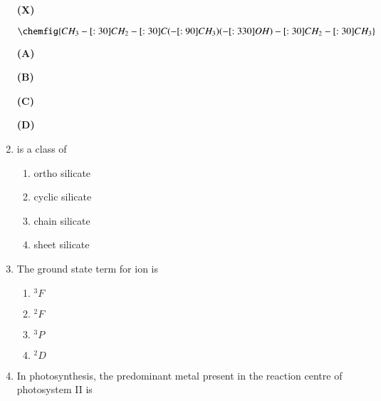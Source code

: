 \documentclass[journal,12pt,onecolumn]{IEEEtran}
\theoremstyle{remark}
\begin{document}
\begin{enumerate}
 

\textbf{(X)}

\[
\chemfig{CH_3-[:30]CH_2-[:30]C(-[:90]CH_3)(-[:330]OH)-[:30]CH_2-[:30]CH_3}
\]

 

\begin{multicols}{2}
\noindent
\textbf{(A)} \\

 

\noindent
\textbf{(B)} \\

 

\noindent
\textbf{(C)} \\

 

\noindent
\textbf{(D)} \\

\end{multicols}

\item {} is a class of \hfill{}
\begin{multicols}{4}
   

\begin{enumerate}
     \item   ortho silicate
     \item   cyclic silicate
     \item   chain silicate
     \item   sheet silicate
\end{enumerate}
\end{multicols}
 

\item The ground state term for  ion is \hfill{}
\begin{multicols}{4}
\begin{enumerate}
     \item   $^3F$
     \item   $^2F$
     \item   $^3P$
     \item   $^2D$
\end{enumerate}
\end{multicols}
 

\item In photosynthesis, the predominant metal present in the reaction centre of photosystem II is \hfill{}
\begin{multicols}{4}
   


\end{multicols}
\end{enumerate}
\end{document}
